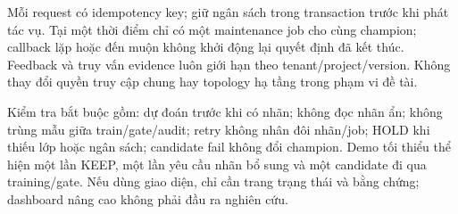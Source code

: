 Mỗi request có idempotency key; giữ ngân sách trong transaction trước khi phát tác vụ. Tại một thời điểm chỉ có một maintenance job cho cùng champion; callback lặp hoặc đến muộn không khởi động lại quyết định đã kết thúc. Feedback và truy vấn evidence luôn giới hạn theo tenant/project/version. Không thay đổi quyền truy cập chung hay topology hạ tầng trong phạm vi đề tài.

Kiểm tra bắt buộc gồm: dự đoán trước khi có nhãn; không đọc nhãn ẩn; không trùng mẫu giữa train/gate/audit; retry không nhân đôi nhãn/job; HOLD khi thiếu lớp hoặc ngân sách; candidate fail không đổi champion. Demo tối thiểu thể hiện một lần KEEP, một lần yêu cầu nhãn bổ sung và một candidate đi qua training/gate. Nếu dùng giao diện, chỉ cần trang trạng thái và bằng chứng; dashboard nâng cao không phải đầu ra nghiên cứu.
